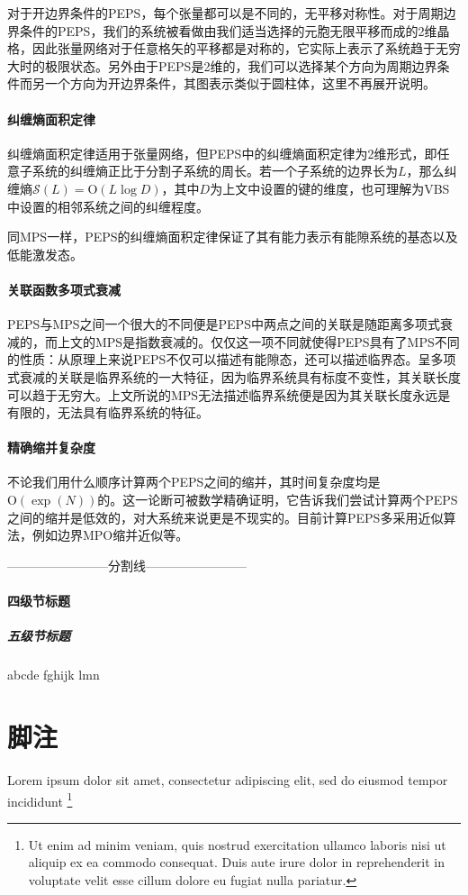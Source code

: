 对于开边界条件的PEPS，每个张量都可以是不同的，无平移对称性。对于周期边界条件的PEPS，我们的系统被看做由我们适当选择的元胞无限平移而成的2维晶格，因此张量网络对于任意格矢的平移都是对称的，它实际上表示了系统趋于无穷大时的极限状态。另外由于PEPS是2维的，我们可以选择某个方向为周期边界条件而另一个方向为开边界条件\cite[3]{osorioireguiInfiniteMatrixProduct2017}，其图表示类似于圆柱体，这里不再展开说明。

\paragraph{纠缠熵面积定律}

纠缠熵面积定律适用于张量网络，但PEPS中的纠缠熵面积定律为2维形式，即任意子系统的纠缠熵正比于分割子系统的周长。若一个子系统的边界长为$L$，那么纠缠熵$\mathcal{S}(L)=\mathrm{O}(L\log\!D)$，其中$D$为上文中设置的键的维度，也可理解为VBS中设置的相邻系统之间的纠缠程度。

同MPS一样，PEPS的纠缠熵面积定律保证了其有能力表示有能隙系统的基态以及低能激发态。

\paragraph{关联函数多项式衰减}

PEPS与MPS之间一个很大的不同便是PEPS中两点之间的关联是随距离多项式衰减的，而上文的MPS是指数衰减的。仅仅这一项不同就使得PEPS具有了MPS不同的性质：从原理上来说PEPS不仅可以描述有能隙态，还可以描述临界态。呈多项式衰减的关联是临界系统的一大特征，因为临界系统具有标度不变性，其关联长度可以趋于无穷大\cite[138]{PracticalIntroductionTensor2014}。上文所说的MPS无法描述临界系统便是因为其关联长度永远是有限的，无法具有临界系统的特征。

\paragraph{精确缩并复杂度}

不论我们用什么顺序计算两个PEPS之间的缩并，其时间复杂度均是$\mathrm{O}\left(\exp(N)\right)$的\cite[139]{PracticalIntroductionTensor2014}。这一论断可被数学精确证明，它告诉我们尝试计算两个PEPS之间的缩并是低效的，对大系统来说更是不现实的。目前计算PEPS多采用近似算法，例如边界MPO缩并近似\cite{lubaschUnifyingProjectedEntangled2014}等。


------------------------分割线------------------------
\paragraph{四级节标题}

\subparagraph{五级节标题}

abcde fghijk lmn

\section{脚注}

Lorem ipsum dolor sit amet, consectetur adipiscing elit, sed do eiusmod tempor
incididunt 
\footnote{Ut enim ad minim veniam, quis nostrud exercitation ullamco laboris
  nisi ut aliquip ex ea commodo consequat.
  Duis aute irure dolor in reprehenderit in voluptate velit esse cillum dolore
  eu fugiat nulla pariatur.}
